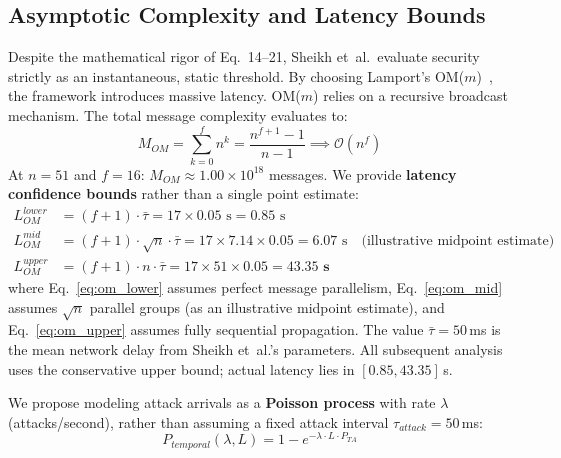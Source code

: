 \documentclass[10pt,twocolumn,letterpaper]{article}
\begin{document}
\begin{enumerate}[leftmargin=*]
\subsection{Asymptotic Complexity and Latency Bounds}
Despite the mathematical rigor of Eq.~14--21, Sheikh et~al.\ evaluate security strictly as an instantaneous, static threshold. By choosing Lamport's OM($m$)~\cite{lamport1982}, the framework introduces massive latency.
OM($m$) relies on a recursive broadcast mechanism. The total message complexity evaluates to:
\begin{equation}
M_{OM} = \sum_{k=0}^{f} n^k = \frac{n^{f+1}-1}{n-1} \implies \mathcal{O}(n^f)
\end{equation}
At $n = 51$ and $f = 16$: $M_{OM} \approx 1.00 \times 10^{18}$ messages.
We provide \textbf{latency confidence bounds} rather than a single point estimate:
\begin{align}
L_{OM}^{lower} &= (f+1) \cdot \bar{\tau} = 17 \times 0.05\text{ s} = 0.85\text{ s} \label{eq:om_lower} \\
L_{OM}^{mid}   &= (f+1) \cdot \sqrt{n} \cdot \bar{\tau} = 17 \times 7.14 \times 0.05 = 6.07\text{ s} \quad \text{(illustrative midpoint estimate)} \label{eq:om_mid} \\
L_{OM}^{upper} &= (f+1) \cdot n \cdot \bar{\tau} = 17 \times 51 \times 0.05 = \mathbf{43.35\text{ s}} \label{eq:om_upper}
\end{align}
where Eq.~\ref{eq:om_lower} assumes perfect message parallelism, Eq.~\ref{eq:om_mid} assumes $\sqrt{n}$ parallel groups (as an illustrative midpoint estimate), and Eq.~\ref{eq:om_upper} assumes fully sequential propagation. The value $\bar{\tau} = 50$\,ms is the mean network delay from Sheikh et~al.'s parameters. All subsequent analysis uses the conservative upper bound; actual latency lies in $[0.85, 43.35]$\,s.

We propose modeling attack arrivals as a \textbf{Poisson process} with rate $\lambda$ (attacks/second), rather than assuming a fixed attack interval $\tau_{attack} = 50$\,ms:
\begin{equation}
P_{temporal}(\lambda, L) = 1 - e^{-\lambda \cdot L \cdot P_{TA}}
\label{eq:poisson}
\end{equation}


\end{enumerate}
\end{document}
